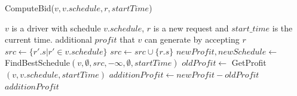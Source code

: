 %
%


\begin{algorithm}[!h]
	\caption{ComputeBid($v, v.schedule, r, startTime$)}
	\label{algo:comp_bid}
	\begin{algorithmic}[1]
		\REQUIRE $v$ is a driver with schedule $v.schedule$, $r$ is a new request and $start\_time$ is the current time.
		\ENSURE additional $profit$ that $v$ can generate by accepting $r$
		\STATE $src \leftarrow \lbrace r'.s | r' \in v.schedule \rbrace$ 
		\STATE $src \leftarrow src \cup \{r.s\}$
		\STATE \small{$newProfit, newSchedule \leftarrow $FindBestSchedule$(v, \emptyset, src, -\infty, \emptyset,  startTime)$} \label{ln:fbs}
		\STATE $oldProfit\leftarrow $ GetProfit$(v, v.schedule, startTime)$ \label{ln:gps}
		\STATE $additionProfit \leftarrow newProfit - oldProfit$
		\RETURN $additionProfit$
	\end{algorithmic}
\end{algorithm}\vspace{-1mm}

